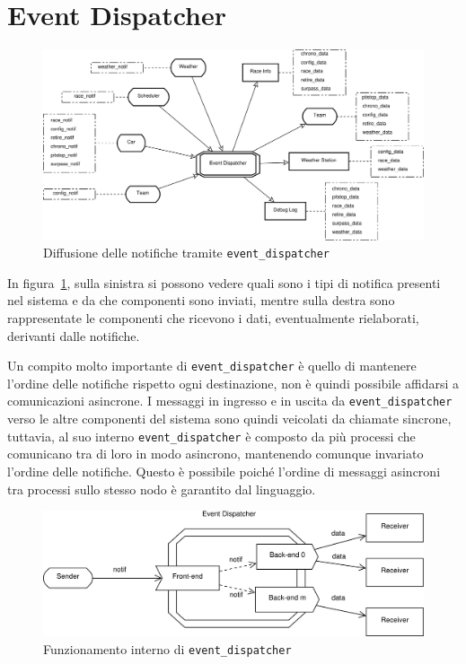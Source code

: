 \documentclass[a4paper]{report}
\begin{document}
\section{Event Dispatcher}
\label{sec:event_dispatcher}
\begin{landscape}
\begin{figure}
\includegraphics[width=0.75\paperheight]{diagrammi/NotifFlow}
\caption{Diffusione delle notifiche tramite \texttt{event\_dispatcher}}
\label{fig:notifFlow}
\end{figure}
\end{landscape}

In figura~\ref{fig:notifFlow}, sulla sinistra si possono vedere quali sono i tipi di notifica presenti nel sistema e da che componenti sono inviati, mentre sulla destra sono rappresentate le componenti che ricevono i dati, eventualmente rielaborati, derivanti dalle notifiche.

Un compito molto importante di \texttt{event\_dispatcher} è quello di mantenere l'ordine delle notifiche rispetto ogni destinazione, non è quindi possibile affidarsi a comunicazioni asincrone.
I messaggi in ingresso e in uscita da \texttt{event\_dispatcher} verso le altre componenti del sistema sono quindi veicolati da chiamate sincrone, tuttavia, al suo interno \texttt{event\_dispatcher} è composto da più processi che comunicano tra di loro in modo asincrono, mantenendo comunque invariato l'ordine delle notifiche.
Questo è possibile poiché l'ordine di messaggi asincroni tra processi sullo stesso nodo è garantito dal linguaggio.

\begin{figure}
\includegraphics[width=\textwidth]{diagrammi/Dispatcher}
\caption{Funzionamento interno di \texttt{event\_dispatcher}}
\label{fig:dispatcher}
\end{figure}
\end{document}
